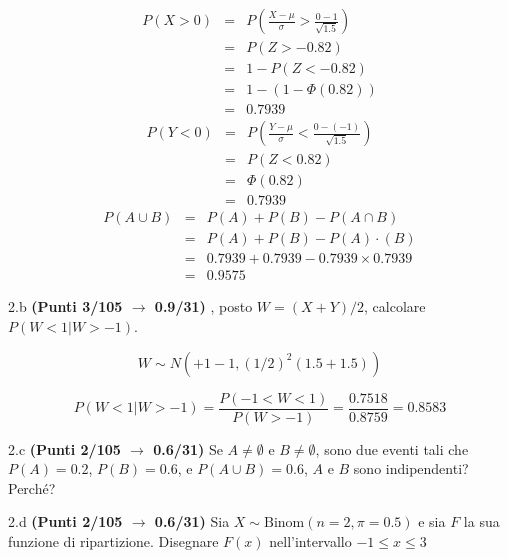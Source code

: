 \documentclass[
  11pt,
]{book}
\theoremstyle{mytheoremstyle}
\theoremstyle{mydefstyle}
\newenvironment{sol}
  {
  \begin{tcolorbox}[enhanced,breakable,arc=0.1mm,boxrule=1pt,colback=white,colframe=iblue,
  title=\bf \fontfamily{lmss}\selectfont \hspace{.5 cm} Soluzione,drop fuzzy shadow]

}{
\end{tcolorbox}
  }
\begin{document}
\begin{sol}
\begin{eqnarray*}
      P( X   >   0 ) 
        &=& P\left(  \frac { X  -  \mu }{ \sigma }  >  \frac { 0  -  1 }{\sqrt{ 1.5 }} \right)  \\
                 &=& P\left(  Z   >   -0.82 \right) \\    &=& 1-P(Z< -0.82 )\\ 
                 &=&  1-(1-\Phi( 0.82 )) \\ &=&  0.7939 
      \end{eqnarray*}\begin{eqnarray*}
      P( Y   <   0 ) 
        &=& P\left(  \frac { Y  -  \mu }{ \sigma }  <  \frac { 0  -  ( -1 ) }{\sqrt{ 1.5 }} \right)  \\
                 &=& P\left(  Z   <   0.82 \right) \\    
                 &=&  \Phi( 0.82 ) \\ &=&  0.7939 
      \end{eqnarray*}\begin{eqnarray}
      P( A \cup B ) &=& P( A )+P( B )-P( A \cap B ) \\
                         &=& P( A )+P( B )-P( A )\cdot ( B ) \\
                         &=&  0.7939 + 0.7939 - 0.7939 \times 0.7939  \\
                         &=&  0.9575 \end{eqnarray}

\end{sol}

2.b \textbf{(Punti 3/105 \(\rightarrow\) 0.9/31)} , posto \(W=(X+Y)/2\), calcolare \(P(W<1|W>-1)\).

\begin{sol}
\[
W\sim N(+1-1,(1/2)^2(1.5+1.5))
\]

\[ 
P(W<1|W>-1)=\frac{P(-1<W<1)}{P(W>-1)}=\frac{0.7518}{0.8759}=0.8583
\]

\end{sol}

2.c \textbf{(Punti 2/105 \(\rightarrow\) 0.6/31)} Se \(A\neq\emptyset\) e \(B\neq\emptyset\), sono due eventi tali che \(P(A)=0.2\), \(P(B)=0.6\), e \(P(A\cup B)=0.6\), \(A\) e \(B\) sono indipendenti? Perché?

2.d \textbf{(Punti 2/105 \(\rightarrow\) 0.6/31)} Sia \(X\sim\text{Binom}(n=2,\pi=0.5)\) e sia \(F\) la sua funzione di ripartizione. Disegnare \(F(x)\) nell'intervallo \(-1\leq x\leq 3\)
\end{document}
